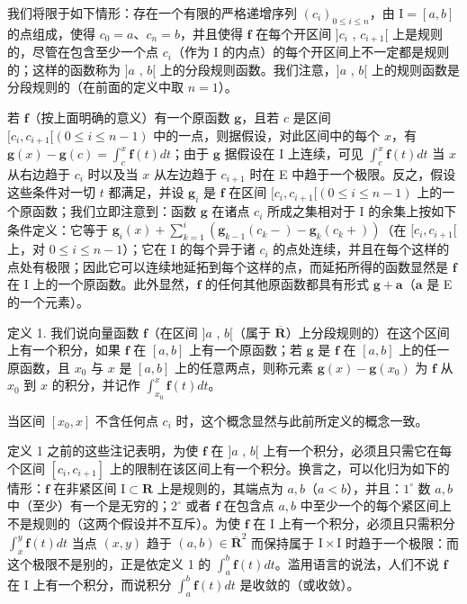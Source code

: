 我们将限于如下情形：存在一个有限的严格递增序列 \((c_i)_{0\leqslant i\leqslant n}\)，由 \(\mathrm{I} = [a,b]\) 的点组成，使得 \(c_0 = a\)、\(c_n = b\)，并且使得 \(\mathbf{f}\) 在每个开区间 \(]c_i\) , \(c_{i + 1}[\) 上是规则的，尽管在包含至少一个点 \(c_i\)（作为 \(\mathrm{I}\) 的内点）的每个开区间上不一定都是规则的；这样的函数称为 \(]a\) , \(b[\) 上的分段规则函数。我们注意，\(]a\) , \(b[\) 上的规则函数是分段规则的（在前面的定义中取 \(n = 1\)）。

若 \(\mathbf{f}\)（按上面明确的意义）有一个原函数 \(\mathbf{g}\)，且若 \(c\) 是区间 \([c_i, c_{i+1}[(0 \leqslant i \leqslant n-1)\) 中的一点，则据假设，对此区间中的每个 \(x\)，有 \(\mathbf{g}(x) - \mathbf{g}(c) = \int_c^x \mathbf{f}(t) dt\)；由于 \(\mathbf{g}\) 据假设在 I 上连续，可见 \(\int_c^x \mathbf{f}(t) dt\) 当 \(x\) 从右边趋于 \(c_i\) 时以及当 \(x\) 从左边趋于 \(c_{i+1}\) 时在 E 中趋于一个极限。反之，假设这些条件对一切 \(t\) 都满足，并设 \(\mathbf{g}_i\) 是 \(\mathbf{f}\) 在区间 \([c_i, c_{i+1}[(0 \leqslant i \leqslant n-1)\) 上的一个原函数；我们立即注意到：函数 \(\mathbf{g}\) 在诸点 \(c_i\) 所成之集相对于 I 的余集上按如下条件定义：它等于 \(\mathbf{g}_i(x) + \sum_{k=1}^i (\mathbf{g}_{k-1}(c_k-) - \mathbf{g}_k(c_k+))\)（在 \([c_i, c_{i+1}[\) 上，对 \(0 \leqslant i \leqslant n-1\)）；它在 I 的每个异于诸 \(c_i\) 的点处连续，并且在每个这样的点处有极限；因此它可以连续地延拓到每个这样的点，而延拓所得的函数显然是 \(\mathbf{f}\) 在 I 上的一个原函数。此外显然，\(\mathbf{f}\) 的任何其他原函数都具有形式 \(\mathbf{g} + \mathbf{a}\)（\(\mathbf{a}\) 是 E 的一个元素）。

定义 1. 我们说向量函数 \(\mathbf{f}\)（在区间 \(]a\) , \(b[\)（属于 \(\overline{\mathbf{R}}\)）上分段规则的）在这个区间上有一个积分，如果 \(\mathbf{f}\) 在 \([a, b]\) 上有一个原函数；若 \(\mathbf{g}\) 是 \(\mathbf{f}\) 在 \([a, b]\) 上的任一原函数，且 \(x_0\) 与 \(x\) 是 \([a, b]\) 上的任意两点，则称元素 \(\mathbf{g}(x) - \mathbf{g}(x_0)\) 为 \(\mathbf{f}\) 从 \(x_0\) 到 \(x\) 的积分，并记作 \(\int_{x_0}^x \mathbf{f}(t) dt\)。

当区间 \([x_0, x]\) 不含任何点 \(c_i\) 时，这个概念显然与此前所定义的概念一致。

定义 1 之前的这些注记表明，为使 \(\mathbf{f}\) 在 \(]a\) , \(b[\) 上有一个积分，必须且只需它在每个区间 \([c_i, c_{i+1}]\) 上的限制在该区间上有一个积分。换言之，可以化归为如下的情形：\(\mathbf{f}\) 在非紧区间 \(\mathrm{I} \subset \mathbf{R}\) 上是规则的，其端点为 \(a, b\)（\(a < b\)），并且：\(1^\circ\) 数 \(a, b\) 中（至少）有一个是无穷的；\(2^\circ\) 或者 \(\mathbf{f}\) 在包含点 \(a, b\) 中至少一个的每个紧区间上不是规则的（这两个假设并不互斥）。为使 \(\mathbf{f}\) 在 \(\mathrm{I}\) 上有一个积分，必须且只需积分 \(\int_x^y \mathbf{f}(t) dt\) 当点 \((x, y)\) 趋于 \((a, b) \in \overline{\mathbf{R}}^2\) 而保持属于 \(\mathrm{I} \times \mathrm{I}\) 时趋于一个极限：而这个极限不是别的，正是依定义 1 的 \(\int_a^b \mathbf{f}(t) dt\)。滥用语言的说法，人们不说 \(\mathbf{f}\) 在 \(\mathrm{I}\) 上有一个积分，而说积分 \(\int_a^b \mathbf{f}(t) dt\) 是收敛的（或收敛）。

